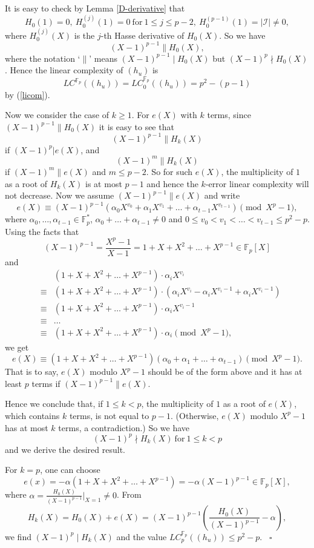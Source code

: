 \documentclass [11pt,a4paper]{article}
\def\F{\mathbb{F}}
\begin{document}
It is easy to check by Lemma \ref{D-derivative} that
$$
H_0(1)=0, ~ H_0^{(j)}(1)=0 ~\mathrm{for}~1\le j\le p-2, ~
H_0^{(p-1)}(1)=|\mathcal{I}|\neq 0,
$$
where $H^{(j)}_0(X)$ is the $j$-th Hasse derivative of $H_0(X)$. So we have
$$
(X-1)^{p-1}\| H_0(X),
$$
where the notation `$\|$' means $(X-1)^{p-1}\mid H_0(X)$ but $(X-1)^{p}\nmid  H_0(X)$.
Hence the linear complexity of $(h_u)$ is
$$
LC^{\F_p}((h_u))=LC^{\F_p}_0((h_u))=p^2-(p-1)
$$
by (\ref{licom}).

Now we consider the case of $k\ge 1$. For $e(X)$ with $k$ terms, since $(X-1)^{p-1}\| H_0(X)$ it is easy to see that
$$
(X-1)^{p-1}\| H_k(X)
$$
if $(X-1)^{p}|e(X)$, and
$$
(X-1)^{m}\| H_k(X)
$$
if  $(X-1)^{m}\| e(X)$ and $m\le p-2$. So for such $e(X)$, the multiplicity of $1$ as a root of $H_k(X)$ is at most $p-1$ and hence the $k$-error linear complexity will not decrease. Now
we assume $(X-1)^{p-1}\| e(X)$ and write
$$
e(X)\equiv (X-1)^{p-1}(\alpha_0X^{v_0}+\alpha_1X^{v_1}+\ldots+\alpha_{t-1}X^{v_{t-1}})  \pmod {X^p-1},
$$
where $\alpha_{0},\ldots,\alpha_{t-1}\in\F_p^*$, $\alpha_{0}+\ldots+\alpha_{t-1}\neq 0$ and $0\le v_0<v_1<\ldots<v_{t-1}\le p^2-p$.
Using the facts that
$$
(X-1)^{p-1}=\frac{X^p-1}{X-1}=1+X+X^{2}+\ldots+X^{p-1}\in\F_p[X]
$$
and
\begin{eqnarray*}
&       &(1+X+X^{2}+\ldots+X^{p-1})\cdot \alpha_iX^{v_i}\\
&\equiv &(1+X+X^{2}+\ldots+X^{p-1})\cdot (\alpha_iX^{v_i}-\alpha_iX^{v_i-1}+\alpha_iX^{v_i-1})\\
&\equiv &(1+X+X^{2}+\ldots+X^{p-1})\cdot \alpha_iX^{v_i-1}\\
&\equiv &\ldots\\
&\equiv &(1+X+X^{2}+\ldots+X^{p-1})\cdot \alpha_i  \pmod {X^p-1},
\end{eqnarray*}
we get
$$
e(X)\equiv (1+X+X^{2}+\ldots+X^{p-1})(\alpha_0+\alpha_1+\ldots+\alpha_{t-1})  \pmod {X^p-1}.
$$
That is to say, $e(X)$ modulo $X^{p}-1$ should be of the form above and it has at least $p$ terms if $(X-1)^{p-1}\| e(X)$.

Hence we conclude that, if $1\le k<p$, the multiplicity of $1$ as a root of $e(X)$, which contains $k$ terms, is not equal to $p-1$. (Otherwise, $e(X)$ modulo $X^{p}-1$ has at most $k$ terms, a contradiction.) So we have
$$
(X-1)^{p}\nmid H_k(X) ~\mathrm{for}~ 1\le k<p
$$
and we derive the desired result.

For $k=p$, one can choose
$$
e(x)=-\alpha(1+X+X^{2}+\ldots+X^{p-1})=-\alpha(X-1)^{p-1}\in\F_p[X],
$$
where $\alpha =\frac{H_0(X)}{(X-1)^{p-1}}\bigg|_{X=1}\neq 0$. From
$$
H_k(X)=H_0(X)+e(X)=(X-1)^{p-1}\left(\frac{H_0(X)}{(X-1)^{p-1}}-\alpha\right),
$$
we find $(X-1)^{p}\mid H_k(X)$ and the value $LC^{\F_p}_p((h_u))\le p^2-p$.     ~\hfill $\square$
\end{document}
